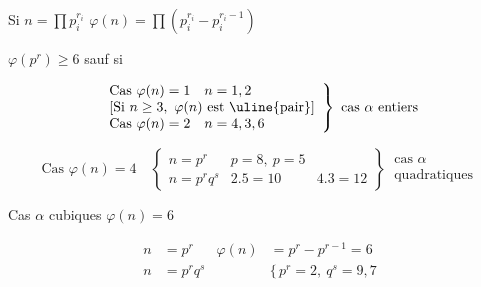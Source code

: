 
\deleted{$\varphi$} Si $n=\prod p_i^{r_i}$ \quad $\varphi(n)=\prod(p_i^{r_i}-p_i^{r_i-1})$

$\varphi(p^r)\geq6$ sauf si


\[
\left.\begin{array}{ll}
\text{Cas }\varphi(n)=1&n=1,2\\
\multicolumn{2}{l}{[\text{Si }n\geq3,\ \varphi(n)\text{ est \uline{pair}}]}\\
\text{Cas }\varphi(n)=2&n=4,3,6
\end{array}\right\}\ \text{cas }\alpha\text{ entiers}
\]

\[
\text{Cas }\varphi(n)=4\quad\left\{\begin{array}{lll}
n=p^r&p=8,\ p=5&\\
n=p^rq^s&2.5=10&4.3=12
\end{array}\right\}\ \begin{gathered}\text{cas }\alpha\\\text{quadratiques}\end{gathered}
\]



Cas $\alpha$ cubiques \qquad $\varphi(n)=6$

\[
\begin{aligned}
n&=p^r&\varphi(n)&=p^r-p^{r-1}=6\\
n&=p^rq^s& &\bigl\{\,p^r=2,\ q^s=9,7
\end{aligned}
\]


